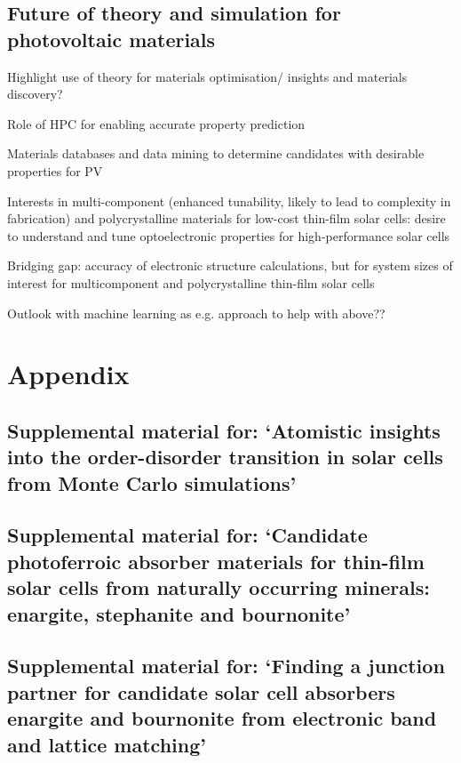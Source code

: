 \documentclass[11pt, twoside]{report}
\begin{document}
\section{Future of theory and simulation for photovoltaic materials}

Highlight use of theory for materials optimisation/ insights and materials discovery?

Role of HPC for enabling accurate property prediction

Materials databases and data mining to determine candidates with desirable properties for PV

Interests in multi-component (enhanced tunability, likely to lead to complexity in fabrication) and polycrystalline materials for low-cost thin-film solar cells: desire to understand and tune optoelectronic properties for high-performance solar cells

Bridging gap: accuracy of electronic structure calculations, but for system sizes of interest for multicomponent and polycrystalline thin-film solar cells

Outlook with machine learning as e.g. approach to help with above??





\appendix
\chapter{Appendix}

\section{Supplemental material for: `Atomistic insights into the order-disorder transition in {\CZTS} solar cells from Monte Carlo simulations'}\label{eris1_appendix}


\section{Supplemental material for: `Candidate photoferroic absorber materials for thin-film solar cells from naturally occurring minerals: enargite, stephanite and bournonite'}\label{App_sulfosalts1}



\section{Supplemental material for: `Finding a junction partner for candidate solar cell absorbers enargite and bournonite from electronic band and lattice matching'}\label{jp_appendix}

\end{document}
